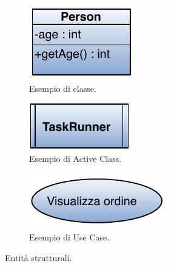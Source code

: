 \documentclass[]{article}
\begin{document}
\begin{figure}
    \centering
    \begin{subfigure}[b]{0.3\textwidth}
        \includegraphics[width=\textwidth]{img/Classe.png}
        \caption{Esempio di classe.}
    \end{subfigure}
    \begin{subfigure}[b]{0.3\textwidth}
        \includegraphics[width=\textwidth]{img/Active.png}
        \caption{Esempio di Active Class.}
    \end{subfigure}
    \begin{subfigure}[b]{0.3\textwidth}
        \includegraphics[width=\textwidth]{img/Usecase.png}
        \caption{Esempio di Use Case.}
    \end{subfigure}
    \caption{Entità strutturali.}
\end{figure}
\end{document}
